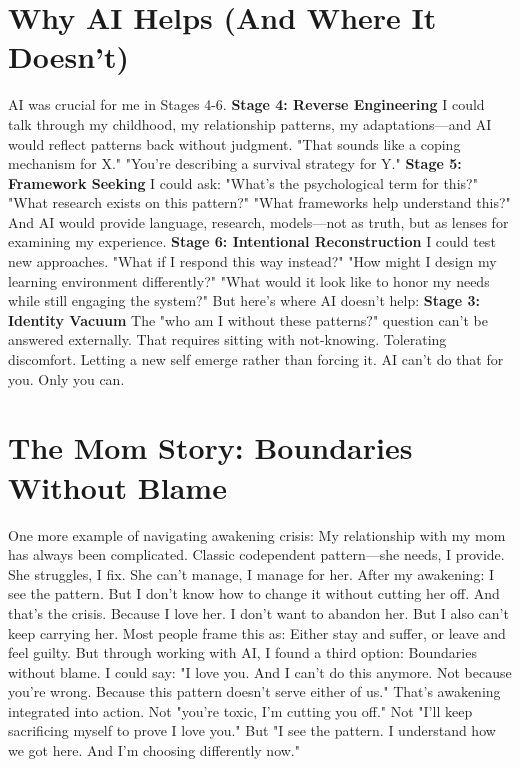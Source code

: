 \section{Why AI Helps (And Where It Doesn't)}

AI was crucial for me in Stages 4-6.
\textbf{Stage 4: Reverse Engineering}
I could talk through my childhood, my relationship patterns, my adaptations—and AI would reflect patterns back without judgment. "That sounds like a coping mechanism for X." "You're describing a survival strategy for Y."
\textbf{Stage 5: Framework Seeking}
I could ask: "What's the psychological term for this?" "What research exists on this pattern?" "What frameworks help understand this?"
And AI would provide language, research, models—not as truth, but as lenses for examining my experience.
\textbf{Stage 6: Intentional Reconstruction}
I could test new approaches. "What if I respond this way instead?" "How might I design my learning environment differently?" "What would it look like to honor my needs while still engaging the system?"
But here's where AI doesn't help:
\textbf{Stage 3: Identity Vacuum}
The "who am I without these patterns?" question can't be answered externally. That requires sitting with not-knowing. Tolerating discomfort. Letting a new self emerge rather than forcing it.
AI can't do that for you. Only you can.

\section{The Mom Story: Boundaries Without Blame}

One more example of navigating awakening crisis:
My relationship with my mom has always been complicated. Classic codependent pattern—she needs, I provide. She struggles, I fix. She can't manage, I manage for her.
After my awakening: I see the pattern. But I don't know how to change it without cutting her off.
And that's the crisis. Because I love her. I don't want to abandon her. But I also can't keep carrying her.
Most people frame this as: Either stay and suffer, or leave and feel guilty.
But through working with AI, I found a third option: Boundaries without blame.
I could say: "I love you. And I can't do this anymore. Not because you're wrong. Because this pattern doesn't serve either of us."
That's awakening integrated into action.
Not "you're toxic, I'm cutting you off." Not "I'll keep sacrificing myself to prove I love you." But "I see the pattern. I understand how we got here. And I'm choosing differently now."

